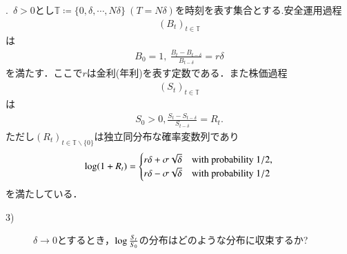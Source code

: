 .\ $\delta > 0$とし$\mathbb{T} \coloneqq \{ 0 ,\delta, \cdots, N\delta \}\ (T = N\delta)$を時刻を表す集合とする.安全運用過程
\begin{align}
	(B_t)_{t \in \mathbb{T}}
\end{align}
は
\begin{align}
	B_0 = 1,\ \frac{B_t - B_{t - \delta}}{B_{t - \delta}} = r \delta
\end{align}
を満たす．ここで$r$は金利(年利)を表す定数である．また株価過程
\begin{align}
	(S_t)_{t \in \mathbb{T}}
\end{align}
は
\begin{align}
	S_0 > 0, \frac{S_t - S_{t - \delta}}{S_{t - \delta}} = R_t.
\end{align}
ただし$(R_t)_{t \in \mathbb{T} \backslash \{0\}}$は独立同分布な確率変数列であり
\begin{align}
	\operatorname{log} (1 + R_t) = \begin{cases}
		r \delta + \sigma \sqrt{\delta} & \mbox{with probability } 1/2, \\
		r \delta - \sigma \sqrt{\delta} & \mbox{with probability } 1/2
	\end{cases}
\end{align} 
を満たしている．
\begin{description}
	\item[3)] $\delta \rightarrow 0$とするとき，$\operatorname{log} \frac{S_t}{S_0}$の分布はどのような分布に収束するか?
\end{description}

